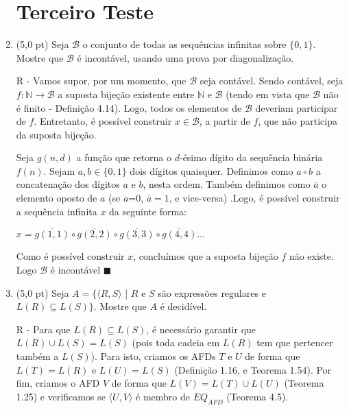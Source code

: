 \documentclass[12pt,a4paper,oneside]{article}
\begin{document}
\begin{enumerate}
	
	\section*{Terceiro Teste}
	
	\item (5,0 pt)  Seja $\mathcal{B}$ o conjunto de todas as sequências infinitas sobre $\{0,1\}$. Mostre que $\mathcal{B}$ é incontável, usando uma prova por diagonalização.
	
	\vspace{0.3cm}
	
	{\color{blue}
		R - Vamos supor, por um momento, que $\mathcal{B}$ seja contável. Sendo contável, seja $f:\mathbb{N} \rightarrow \mathcal{B}$ a suposta bijeção existente entre $\mathbb{N}$ e $\mathcal{B}$ (tendo em vista que $\mathcal{B}$ não é finito - Definição 4.14). Logo, todos os elementos de $\mathcal{B}$ deveriam participar de $f$. Entretanto, é possível construir $x \in \mathcal{B}$, a partir de $f$, que não participa da suposta bijeção.
		
		Seja $g(n,d)$ a função que retorna o $d$-ésimo dígito da sequência binária $f(n)$. Sejam $a,b \in \{0,1\} $ dois dígitos quaisquer. Definimos como $a \circ b$ a concatenação dos dígitos $a$ e $b$, nesta ordem. Também definimos como $\overline{a}$ o elemento oposto de $a$ (se $a$=0, $\overline{a} = 1$, e vice-versa) .Logo, é possível construir a sequência infinita $x$ da seguinte forma:
		\begin{center}
			$x = \overline{g(1,1)} \circ \overline{g(2,2)} \circ \overline{g(3,3)} \circ \overline{g(4,4)} \ldots$
		\end{center}
	
		Como é possível construir $x$, concluímos que a suposta bijeção $f$ não existe. Logo $\mathcal{B}$ é incontável $\blacksquare$
	}
	
	\newpage
	
	\item (5,0 pt) Seja $A = \{\langle R,S \rangle$ | $R$ e $S$ são expressões regulares e $L(R) \subseteq L(S)\}$. Mostre que $A$ é decidível.
	
	\vspace{0.3cm}
	
	{\color{blue}
		R - Para que $L(R) \subseteq L(S)$, é necessário garantir que $L(R) \cup L(S) = L(S)$ (pois toda cadeia em $L(R)$ tem que pertencer também a $L(S)$). Para isto, criamos os AFDs $T$ e $U$ de forma que $L(T) = L(R)$ e $L(U) = L(S)$ (Definição 1.16, e Teorema 1.54). Por fim, criamos o AFD $V$ de forma que $L(V) = L(T) \cup L(U)$ (Teorema 1.25) e verificamos se $\langle U, V \rangle$ é membro de $EQ_{AFD}$ (Teorema 4.5).
		
}
\end{enumerate}
\end{document}
